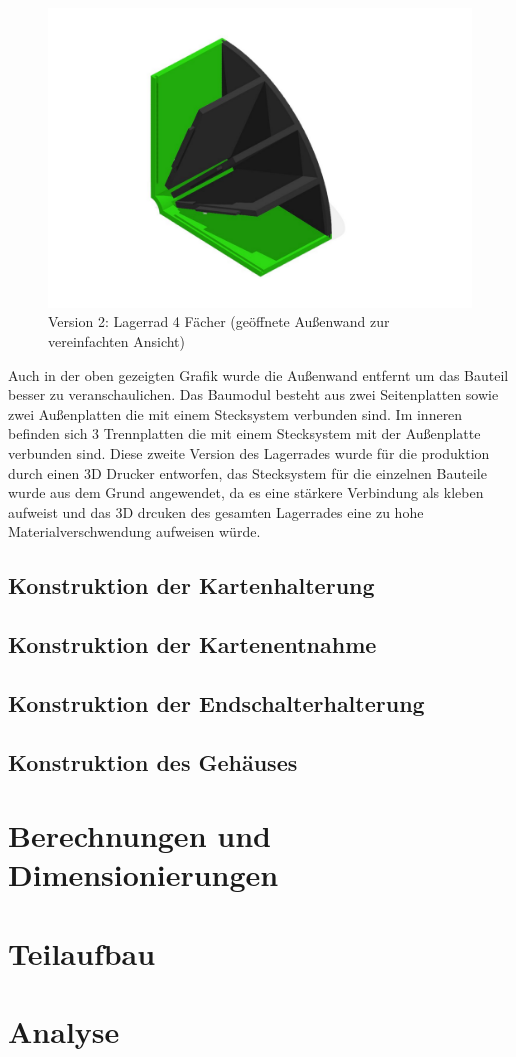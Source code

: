 \begin{figure}[H]
    \centering
    \includegraphics[scale=0.5,page=1]{fig/mech/LagerRad4F}
    \caption{Version 2: Lagerrad 4 Fächer (geöffnete Außenwand zur vereinfachten Ansicht)}
\end{figure}

Auch in der oben gezeigten Grafik wurde die Außenwand entfernt um das Bauteil besser zu veranschaulichen. Das Baumodul besteht aus zwei Seitenplatten sowie zwei Außenplatten die
mit einem Stecksystem verbunden sind. Im inneren befinden sich 3 Trennplatten die mit einem Stecksystem mit der Außenplatte verbunden sind. Diese zweite Version des Lagerrades wurde für die produktion durch einen 3D Drucker
entworfen, das Stecksystem für die einzelnen Bauteile wurde aus dem Grund angewendet, da es eine stärkere Verbindung als kleben aufweist und das 3D drcuken des gesamten Lagerrades eine zu hohe Materialverschwendung aufweisen würde.

\subsection{Konstruktion der Kartenhalterung}

\subsection{Konstruktion der Kartenentnahme}

\subsection{Konstruktion der Endschalterhalterung}

\subsection{Konstruktion des Gehäuses}

\section{Berechnungen und Dimensionierungen}

\section{Teilaufbau}

\section{Analyse}